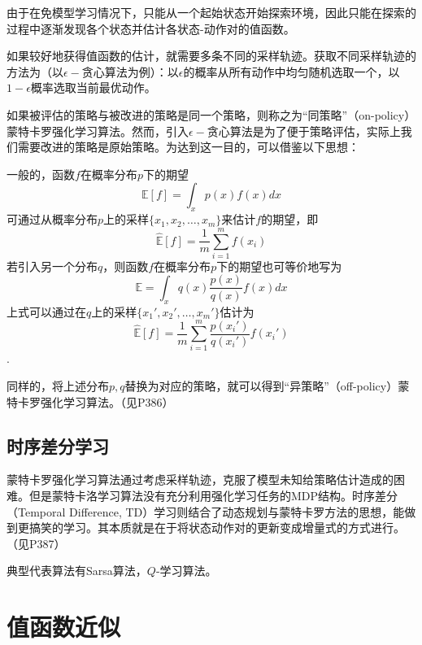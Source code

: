 由于在免模型学习情况下，只能从一个起始状态开始探索环境，因此只能在探索的过程中逐渐发现各个状态并估计各状态-动作对的值函数。

如果较好地获得值函数的估计，就需要多条不同的采样轨迹。获取不同采样轨迹的方法为（以$\epsilon-$贪心算法为例）：以$\epsilon$的概率从所有动作中均匀随机选取一个，以$1-\epsilon$概率选取当前最优动作。

如果被评估的策略与被改进的策略是同一个策略，则称之为“同策略”（on-policy）蒙特卡罗强化学习算法。然而，引入$\epsilon-$贪心算法是为了便于策略评估，实际上我们需要改进的策略是原始策略。为达到这一目的，可以借鉴以下思想：

一般的，函数$f$在概率分布$p$下的期望
\begin{equation}
\mathbb E[f]=\int_xp(x)f(x)dx
\end{equation}
可通过从概率分布$p$上的采样$\{x_1,x_2,\dots,x_m\}$来估计$f$的期望，即
\begin{equation}
\mathbb {\hat E}[f]=\frac{1}{m}\sum_{i=1}^mf(x_i)
\end{equation}
若引入另一个分布$q$，则函数$f$在概率分布$p$下的期望也可等价地写为
\begin{equation}
\mathbb E=\int_x q(x)\frac{p(x)}{q(x)}f(x)dx
\end{equation}
上式可以通过在$q$上的采样$\{x_1',x_2',\dots,x_m'\}$估计为
\begin{equation}
\mathbb {\hat E}[f]=\frac{1}{m}\sum_{i=1}^m\frac{p(x_i')}{q(x_i')}f(x_i')
\end{equation}
.

同样的，将上述分布$p,q$替换为对应的策略，就可以得到“异策略”（off-policy）蒙特卡罗强化学习算法。（见P386）

\subsection{时序差分学习}

蒙特卡罗强化学习算法通过考虑采样轨迹，克服了模型未知给策略估计造成的困难。但是蒙特卡洛学习算法没有充分利用强化学习任务的MDP结构。时序差分（Temporal Difference, TD）学习则结合了动态规划与蒙特卡罗方法的思想，能做到更搞笑的学习。其本质就是在于将状态动作对的更新变成增量式的方式进行。（见P387）

典型代表算法有Sarsa算法，$Q$-学习算法。

\section{值函数近似}

